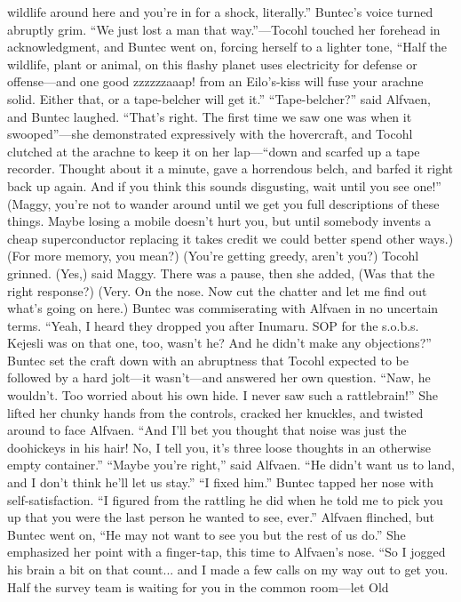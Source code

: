 \documentclass[9pt]{article}
\begin{document}
wildlife around here and you’re in for a shock, literally.” Buntec’s voice turned abruptly grim. “We just
lost a man that way.”—Tocohl touched her forehead in acknowledgment, and Buntec went on, forcing
herself to a lighter tone, “Half the wildlife, plant or animal, on this flashy planet uses electricity for defense
or offense—and one good zzzzzzaaap! from an Eilo’s-kiss will fuse your arachne solid. Either that, or a
tape-belcher will get it.”
“Tape-belcher?” said Alfvaen, and Buntec laughed. “That’s right. The first time we saw one was
when it swooped”—she demonstrated expressively with the hovercraft, and Tocohl clutched at the
arachne to keep it on her lap—“down and scarfed up a tape recorder. Thought about it a minute, gave a
horrendous belch, and barfed it right back up again. And if you think this sounds disgusting, wait until you
see one!”
(Maggy, you’re not to wander around until we get you full descriptions of these things. Maybe losing
a mobile doesn’t hurt you, but until somebody invents a cheap superconductor replacing it takes credit
we could better spend other ways.)
(For more memory, you mean?)
(You’re getting greedy, aren’t you?) Tocohl grinned.
(Yes,) said Maggy. There was a pause, then she added, (Was that the right response?)
(Very. On the nose. Now cut the chatter and let me find out what’s going on here.)
Buntec was commiserating with Alfvaen in no uncertain terms. “Yeah, I heard they dropped you after
Inumaru. SOP for the s.o.b.s. Kejesli was on that one, too, wasn’t he? And he didn’t make any
objections?”
Buntec set the craft down with an abruptness that Tocohl expected to be followed by a hard jolt—it
wasn’t—and answered her own question. “Naw, he wouldn’t. Too worried about his own hide. I never
saw such a rattlebrain!” She lifted her chunky hands from the controls, cracked her knuckles, and twisted
around to face Alfvaen. “And I’ll bet you thought that noise was just the doohickeys in his hair! No, I tell
you, it’s three loose thoughts in an otherwise empty container.”
“Maybe you’re right,” said Alfvaen. “He didn’t want us to land, and I don’t think he’ll let us stay.”
“I fixed him.” Buntec tapped her nose with self-satisfaction. “I figured from the rattling he did when
he told me to pick you up that you were the last person he wanted to see, ever.” Alfvaen flinched, but
Buntec went on, “He may not want to see you but the rest of us do.” She emphasized her point with a
finger-tap, this time to Alfvaen’s nose. “So I jogged his brain a bit on that count... and I made a few calls
on my way out to get you. Half the survey team is waiting for you in the common room—let Old
\end{document}
